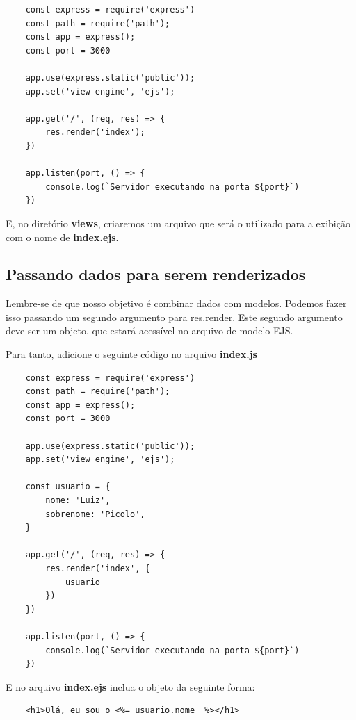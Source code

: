 \begin{verbatim}
	const express = require('express')
	const path = require('path');
	const app = express();
	const port = 3000
	
	app.use(express.static('public'));
	app.set('view engine', 'ejs');
	
	app.get('/', (req, res) => {
		res.render('index');
	})
	
	app.listen(port, () => {
		console.log(`Servidor executando na porta ${port}`)
	})
\end{verbatim}

E, no diretório \textbf{views}, criaremos um arquivo que será o utilizado para a exibição com o nome de \textbf{index.ejs}.

\subsection{Passando dados para serem renderizados}

Lembre-se de que nosso objetivo é combinar dados com modelos. Podemos fazer isso passando um segundo argumento para res.render. Este segundo argumento deve ser um objeto, que estará acessível no arquivo de modelo EJS.

Para tanto, adicione o seguinte código no arquivo \textbf{index.js}

\begin{verbatim}
	const express = require('express')
	const path = require('path');
	const app = express();
	const port = 3000
	
	app.use(express.static('public'));
	app.set('view engine', 'ejs');
	
	const usuario = {
		nome: 'Luiz',
		sobrenome: 'Picolo',
	}
	
	app.get('/', (req, res) => {
		res.render('index', {
			usuario
		})
	})
	
	app.listen(port, () => {
		console.log(`Servidor executando na porta ${port}`)
	})
\end{verbatim}

E no arquivo \textbf{index.ejs} inclua o objeto da seguinte forma:

\begin{verbatim}
	<h1>Olá, eu sou o <%= usuario.nome  %></h1>
\end{verbatim}

